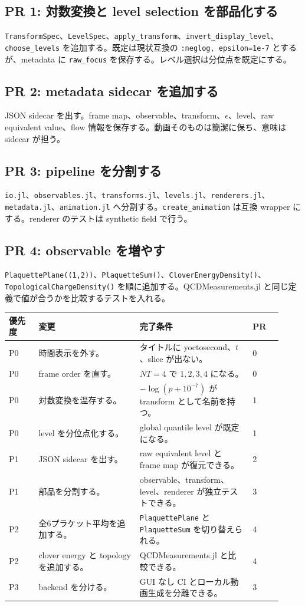 \documentclass[uplatex,dvipdfmx,ja=standard,11pt,a4paper]{bxjsarticle}
\newcommand{\code}[1]{\texttt{#1}}
\begin{document}
\subsection{PR 1: 対数変換と level selection を部品化する}
\code{TransformSpec}、\code{LevelSpec}、\code{apply\_transform}、\code{invert\_display\_level}、\code{choose\_levels} を追加する。既定は現状互換の \code{:neglog, epsilon=1e-7} とするが、metadata に \code{raw\_focus} を保存する。レベル選択は分位点を既定にする。

\subsection{PR 2: metadata sidecar を追加する}
JSON sidecar を出す。frame map、observable、transform、\(\epsilon\)、level、raw equivalent value、flow 情報を保存する。動画そのものは簡潔に保ち、意味は sidecar が担う。

\subsection{PR 3: pipeline を分割する}
\code{io.jl}、\code{observables.jl}、\code{transforms.jl}、\code{levels.jl}、\code{renderers.jl}、\code{metadata.jl}、\code{animation.jl} へ分割する。\code{create\_animation} は互換 wrapper にする。renderer のテストは synthetic field で行う。

\subsection{PR 4: observable を増やす}
\code{PlaquettePlane((1,2))}、\code{PlaquetteSum()}、\code{CloverEnergyDensity()}、\code{TopologicalChargeDensity()} を順に追加する。QCDMeasurements.jl と同じ定義で値が合うかを比較するテストを入れる。

\begin{longtable}{p{0.10\linewidth}p{0.34\linewidth}p{0.38\linewidth}p{0.10\linewidth}}
\toprule
優先度 & 変更 & 完了条件 & PR \\
\midrule
P0 & 時間表示を外す。 & タイトルに yoctosecond、\(t\)、slice が出ない。 & 0 \\
P0 & frame order を直す。 & \(NT=4\) で \(1,2,3,4\) になる。 & 0 \\
P0 & 対数変換を温存する。 & \(-\log(p+10^{-7})\) が transform として名前を持つ。 & 1 \\
P0 & level を分位点化する。 & global quantile level が既定になる。 & 1 \\
P1 & JSON sidecar を出す。 & raw equivalent level と frame map が復元できる。 & 2 \\
P1 & 部品を分割する。 & observable、transform、level、renderer が独立テストできる。 & 3 \\
P2 & 全6プラケット平均を追加する。 & \code{PlaquettePlane} と \code{PlaquetteSum} を切り替えられる。 & 4 \\
P2 & clover energy と topology を追加する。 & QCDMeasurements.jl と比較できる。 & 4 \\
P3 & backend を分ける。 & GUI なし CI とローカル動画生成を分離できる。 & 3 \\
\bottomrule
\end{longtable}
\end{document}
